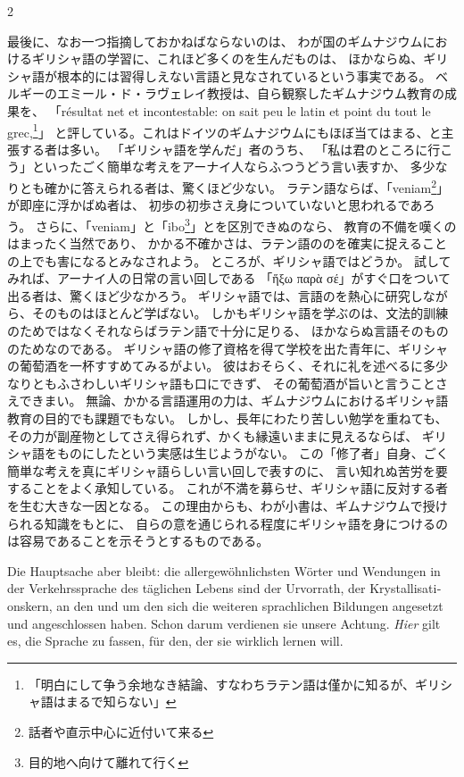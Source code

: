 \begin{paracol}{2}
\begin{japanese}
最後に、なお一つ指摘しておかねばならないのは、
わが国のギムナジウムにおけるギリシャ語の学習に、これほど多くのを生んだものは、
ほかならぬ、ギリシャ語が根本的には習得しえない言語と見なされているという事実である。
ベルギーのエミール・ド・ラヴェレイ教授は、自ら観察したギムナジウム教育の成果を、
「\textfrench{résultat net et incontestable: on sait peu le latin et point du tout le grec,}\footnote{「明白にして争う余地なき結論、すなわちラテン語は僅かに知るが、ギリシャ語はまるで知らない」}」
と評している。これはドイツのギムナジウムにもほぼ当てはまる、と主張する者は多い。
「ギリシャ語を学んだ」者のうち、
「私は君のところに行こう」といったごく簡単な考えをアーナイ人ならふつうどう言い表すか、
多少なりとも確かに答えられる者は、驚くほど少ない。
ラテン語ならば、「\textlatin{veniam}\footnote{話者や直示中心に近付いて来る}」が即座に浮かばぬ者は、
初歩の初歩さえ身についていないと思われるであろう。
さらに、「\textlatin{veniam}」と「\textlatin{ibo}\footnote{目的地へ向けて離れて行く}」とを区別できぬのなら、
教育の不備を嘆くのはまったく当然であり、
かかる不確かさは、ラテン語ののを確実に捉えることの上でも害になるとみなされよう。
ところが、ギリシャ語ではどうか。
試してみれば、アーナイ人の日常の言い回しである
「\textgreek[variant=ancient]{ἥξω παρὰ σέ}」がすぐ口をついて出る者は、驚くほど少なかろう。
ギリシャ語では、言語のを熱心に研究しながら、そのものはほとんど学ばない。
しかもギリシャ語を学ぶのは、文法的訓練のためではなく\—{}それならばラテン語で十分に足りる\—{}、
ほかならぬ言語そのもののためなのである。
ギリシャ語の修了資格を得て学校を出た青年に、ギリシャの葡萄酒を一杯すすめてみるがよい。
彼はおそらく、それに礼を述べるに多少なりともふさわしいギリシャ語も口にできず、
その葡萄酒が旨いと言うことさえできまい。
無論、かかる言語運用の力は、ギムナジウムにおけるギリシャ語教育の目的でも課題でもない。
しかし、長年にわたり苦しい勉学を重ねても、その力が副産物としてさえ得られず、かくも縁遠いままに見えるならば、
ギリシャ語をものにしたという実感は生じようがない。
この「修了者」自身、ごく簡単な考えを真にギリシャ語らしい言い回しで表すのに、
言い知れぬ苦労を要することをよく承知している。
これが不満を募らせ、ギリシャ語に反対する者を生む大きな一因となる。
この理由からも、わが小書は、ギムナジウムで授けられる知識をもとに、
自らの意を通じられる程度にギリシャ語を身につけるのは容易であることを示そうとするものである。
\end{japanese}
\switchcolumn*

\begin{german}
Die Hauptsache aber bleibt: die allergewöhnlichsten Wörter und Wendungen
in der Ver\textcompwordmark{}kehrs\textcompwordmark{}sprache des
täglichen Lebens sind der Urvorrath, der Krystallisationskern,
an den und um den sich die weiteren sprachlichen Bildungen angesetzt
und angeschlossen haben. Schon darum verdienen sie unsere Achtung.
\emph{Hier} gilt es, die Sprache zu fassen, für den, der sie wirklich
lernen will.
\end{german}
\switchcolumn


\end{paracol}
